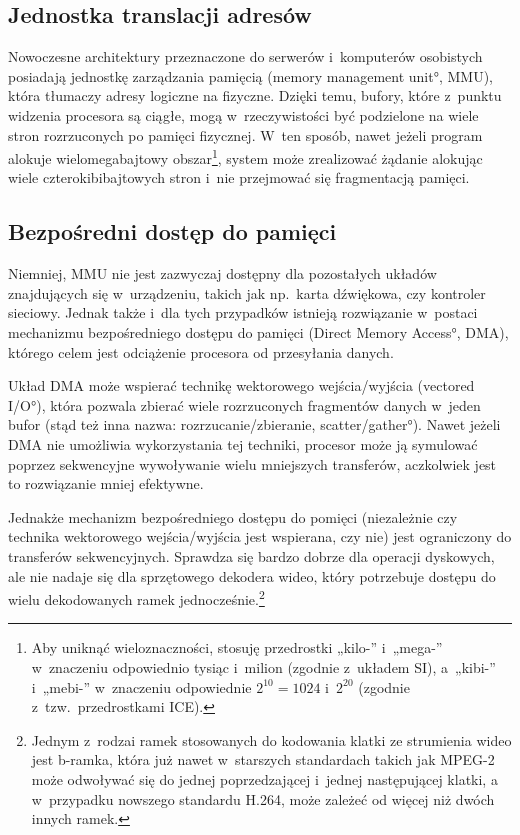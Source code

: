 \subsection{Jednostka translacji adresów}

Nowoczesne architektury przeznaczone do serwerów i~komputerów
osobistych posiadają jednostkę zarządzania pamięcią (\ang{memory
  management unit}, MMU), która tłumaczy adresy logiczne na fizyczne.
Dzięki temu, bufory, które z~punktu widzenia procesora są ciągłe, mogą
w~rzeczywistości być podzielone na wiele stron rozrzuconych po pamięci
fizycznej.  W~ten sposób, nawet jeżeli program alokuje
wielomegabajtowy obszar\footnote{Aby uniknąć wieloznaczności, stosuję
  przedrostki „kilo-” i~„mega-” w~znaczeniu odpowiednio tysiąc
  i~milion (zgodnie z~układem SI), a~„kibi-” i~„mebi-” w~znaczeniu
  odpowiednie $2^{10} = 1024$ i~$2^{20}$ (zgodnie
  z~tzw.\ przedrostkami ICE).}, system może zrealizować żądanie
alokując wiele czterokibibajtowych stron i~nie przejmować się
fragmentacją pamięci.

\subsection{Bezpośredni dostęp do pamięci}

Niemniej, MMU nie jest zazwyczaj dostępny dla pozostałych układów
znajdujących się w~urządzeniu, takich jak np.\ karta dźwiękowa, czy
kontroler sieciowy.  Jednak także i~dla tych przypadków istnieją
rozwiązanie w~postaci mechanizmu bezpośredniego dostępu do pamięci
(\ang{Direct Memory Access}, DMA), którego celem jest odciążenie
procesora od przesyłania danych.

Układ DMA może wspierać technikę wektorowego wejścia/wyjścia
(\ang{vectored I/O}), która pozwala zbierać wiele rozrzuconych
fragmentów danych w~jeden bufor (stąd też inna nazwa:
rozrzucanie/zbieranie, \ang{scatter/gather}).  Nawet jeżeli DMA nie
umożliwia wykorzystania tej techniki, procesor może ją symulować
poprzez sekwencyjne wywoływanie wielu mniejszych transferów,
aczkolwiek jest to rozwiązanie mniej efektywne.

Jednakże mechanizm bezpośredniego dostępu do pomięci (niezależnie czy
technika wektorowego wejścia/wyjścia jest wspierana, czy nie) jest
ograniczony do transferów sekwencyjnych.  Sprawdza się bardzo dobrze
dla operacji dyskowych, ale nie nadaje się dla sprzętowego dekodera
wideo, który potrzebuje dostępu do wielu dekodowanych ramek
jednocześnie.\footnote{Jednym z~rodzai ramek stosowanych do kodowania
  klatki ze strumienia wideo jest b-ramka, która już nawet w~starszych
  standardach takich jak MPEG-2 może odwoływać się do jednej
  poprzedzającej i~jednej następującej klatki, a w~przypadku nowszego
  standardu H.264, może zależeć od więcej niż dwóch innych ramek.}

